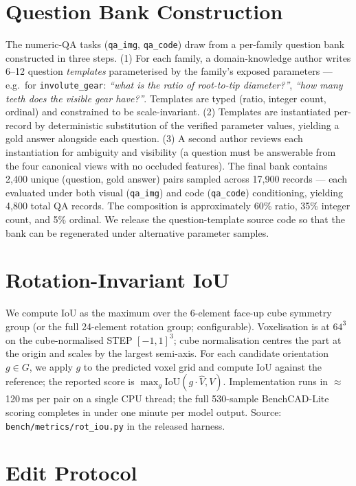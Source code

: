 \documentclass{article}
\begin{document}
\section{Question Bank Construction}
\label{app:qbank}

The numeric-QA tasks (\texttt{qa\_img}, \texttt{qa\_code}) draw from a per-family question bank constructed in three steps. (1) For each family, a domain-knowledge author writes 6--12 question \emph{templates} parameterised by the family's exposed parameters --- e.g.\ for \texttt{involute\_gear}: \emph{``what is the ratio of root-to-tip diameter?''}, \emph{``how many teeth does the visible gear have?''}. Templates are typed (ratio, integer count, ordinal) and constrained to be scale-invariant. (2) Templates are instantiated per-record by deterministic substitution of the verified parameter values, yielding a gold answer alongside each question. (3) A second author reviews each instantiation for ambiguity and visibility (a question must be answerable from the four canonical views with no occluded features). The final bank contains 2{,}400 unique (question, gold answer) pairs sampled across 17{,}900 records --- each evaluated under both visual (\texttt{qa\_img}) and code (\texttt{qa\_code}) conditioning, yielding 4{,}800 total QA records. The composition is approximately 60\% ratio, 35\% integer count, and 5\% ordinal. We release the question-template source code so that the bank can be regenerated under alternative parameter samples.

\section{Rotation-Invariant IoU}
\label{app:iou}

We compute IoU as the maximum over the 6-element face-up cube symmetry group (or the full 24-element rotation group; configurable). Voxelisation is at $64^3$ on the cube-normalised STEP $[-1, 1]^3$; cube normalisation centres the part at the origin and scales by the largest semi-axis. For each candidate orientation $g \in G$, we apply $g$ to the predicted voxel grid and compute IoU against the reference; the reported score is $\max_{g} \mathrm{IoU}(g \cdot \hat{V}, V)$. Implementation runs in $\approx$120\,ms per pair on a single CPU thread; the full 530-sample BenchCAD-Lite scoring completes in under one minute per model output. Source: \texttt{bench/metrics/rot\_iou.py} in the released harness.

\section{Edit Protocol}
\label{app:edit_protocol}
\end{document}
